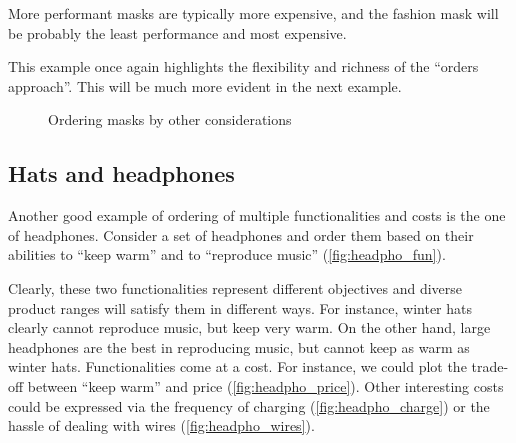 
More performant masks are typically more expensive, and the fashion mask will be probably the least performance and most expensive.

This example once again highlights the flexibility and richness of the ``orders approach''.
This will be much more evident in the next example.

\vfill
\begin{figure*}[h!]
    \caption{Ordering masks by other considerations}
\end{figure*}


\clearpage
\subsection{Hats and headphones}
Another good example of ordering of multiple functionalities and costs is the one of headphones.
Consider a set of headphones and order them based on their abilities to ``keep warm'' and to ``reproduce music'' (\cref{fig:headpho_fun}).


Clearly, these two functionalities represent different objectives and diverse product ranges will satisfy them in different ways.
For instance, winter hats clearly cannot reproduce music, but keep very warm.
On the other hand, large headphones are the best in reproducing music, but cannot keep as warm as winter hats.
Functionalities come at a cost.
For instance, we could plot the trade-off between ``keep warm'' and price (\cref{fig:headpho_price}).
Other interesting costs could be expressed via the frequency of charging (\cref{fig:headpho_charge}) or the hassle of dealing with wires (\cref{fig:headpho_wires}).

